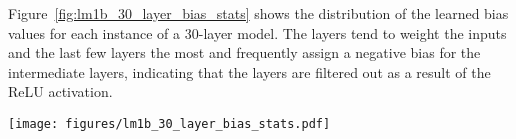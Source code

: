 Figure~\ref{fig:lm1b_30_layer_bias_stats} shows the distribution of the learned bias values for each \GenC{} instance of a 30-layer model. The layers tend to weight the inputs and the last few layers the most and frequently assign a negative bias for the intermediate layers, indicating that the layers are filtered out as a result of the ReLU activation. 

\begin{figure*}[h]
    \centering
    \texttt{[image: figures/lm1b\_30\_layer\_bias\_stats.pdf]}
    \caption{Distribution of learned bias values on LM1B pre-training with a 30 layer \GenC{} transformer model. The solid line indicates the median value and the shaded area represents the 90th percentile.}
    \label{fig:lm1b_30_layer_bias_stats}
\end{figure*}